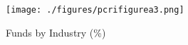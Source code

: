 
\begin{figure}
    \centering
\texttt{[image: ./figures/pcrifigurea3.png]}
\caption{Funds by Industry (\%)\label{fig:pcrifigurea3}}
\end{figure}
